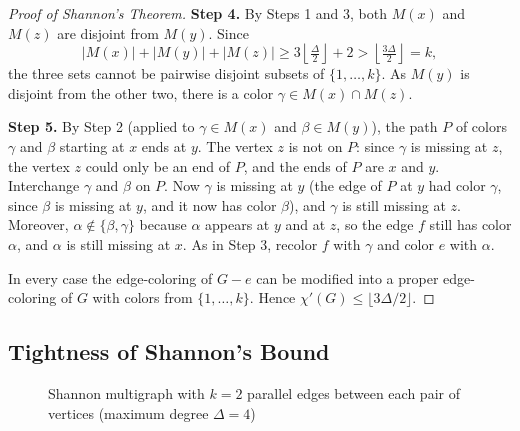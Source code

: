 \documentclass{article}
\theoremstyle{definition}
\begin{document}
\begin{proof}[Proof of Shannon's Theorem]
\textbf{Step 4.} By Steps 1 and 3, both $M(x)$ and $M(z)$ are disjoint from $M(y)$. Since
\begin{equation*}
|M(x)| + |M(y)| + |M(z)| \geq 3\left\lfloor \tfrac{\Delta}{2} \right\rfloor + 2 > \left\lfloor \tfrac{3\Delta}{2} \right\rfloor = k,
\end{equation*}
the three sets cannot be pairwise disjoint subsets of $\{1, \ldots, k\}$. As $M(y)$ is disjoint from the other two, there is a color $\gamma \in M(x) \cap M(z)$.

\textbf{Step 5.} By Step 2 (applied to $\gamma \in M(x)$ and $\beta \in M(y)$), the path $P$ of colors $\gamma$ and $\beta$ starting at $x$ ends at $y$. The vertex $z$ is not on $P$: since $\gamma$ is missing at $z$, the vertex $z$ could only be an end of $P$, and the ends of $P$ are $x$ and $y$. Interchange $\gamma$ and $\beta$ on $P$. Now $\gamma$ is missing at $y$ (the edge of $P$ at $y$ had color $\gamma$, since $\beta$ is missing at $y$, and it now has color $\beta$), and $\gamma$ is still missing at $z$. Moreover, $\alpha \notin \{\beta, \gamma\}$ because $\alpha$ appears at $y$ and at $z$, so the edge $f$ still has color $\alpha$, and $\alpha$ is still missing at $x$. As in Step 3, recolor $f$ with $\gamma$ and color $e$ with $\alpha$.

In every case the edge-coloring of $G - e$ can be modified into a proper edge-coloring of $G$ with colors from $\{1, \ldots, k\}$. Hence $\chi'(G) \leq \lfloor 3\Delta/2 \rfloor$.
\end{proof}

\subsection*{Tightness of Shannon's Bound}

\begin{figure}[ht]
\centering
{}
\caption{Shannon multigraph with $k = 2$ parallel edges between each pair of vertices (maximum degree $\Delta = 4$)}
\label{fig:shannon-multigraph-k2}
\end{figure}
\end{document}
